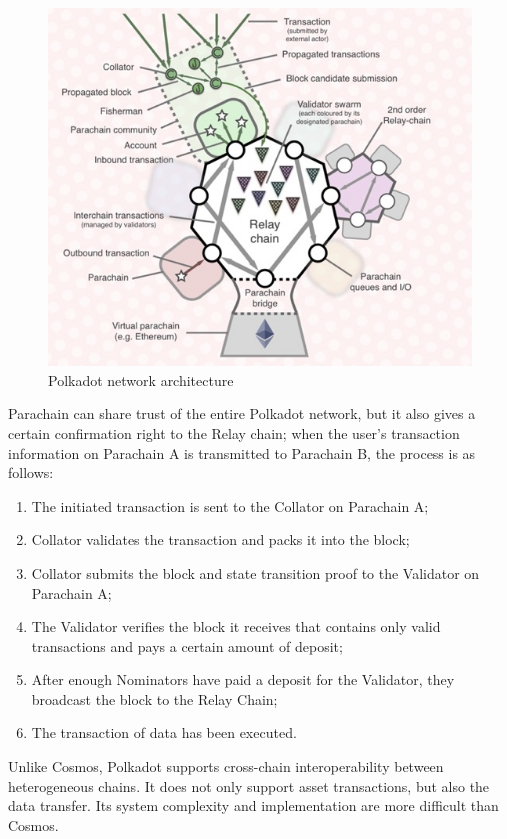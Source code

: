 \begin{figure}[H]
    \includegraphics[width=1\textwidth]{./figures/Polkadot.jpg}
    \centering
    \caption{Polkadot network architecture \protect\footnotemark}
    \centering
\end{figure}

\noindent Parachain can share trust of the entire Polkadot network, but it also gives a certain confirmation right to the Relay chain; when the user's transaction information on Parachain A is transmitted to Parachain B, the process is as follows:
\begin{enumerate}
    \item The initiated transaction is sent to the Collator on Parachain A;
    \item Collator validates the transaction and packs it into the block; 
    \item Collator submits the block and state transition proof to the Validator on Parachain A;
    \item The Validator verifies the block it receives that contains only valid transactions and pays a certain amount of deposit;
    \item  After enough Nominators have paid a deposit for the Validator, they broadcast the block to the Relay Chain;
    \item The transaction of data has been executed.
\end{enumerate}
\noindent Unlike Cosmos, Polkadot supports cross-chain interoperability between heterogeneous chains. It does not only support asset transactions, but also the data transfer. Its system complexity and implementation are more difficult than Cosmos.

